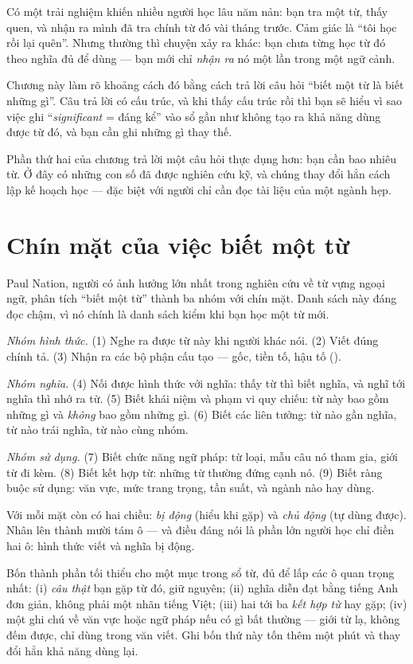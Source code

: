 \documentclass[../../english.tex]{subfiles}
\begin{document}
Có một trải nghiệm khiến nhiều người học lâu năm nản: bạn tra một từ, thấy quen, và nhận ra mình đã tra chính từ đó vài tháng trước. Cảm giác là ``tôi học rồi lại quên''. Nhưng thường thì chuyện xảy ra khác: bạn chưa từng học từ đó theo nghĩa đủ để dùng --- bạn mới chỉ \emph{nhận ra} nó một lần trong một ngữ cảnh.

Chương này làm rõ khoảng cách đó bằng cách trả lời câu hỏi ``biết một từ là biết những gì''. Câu trả lời có cấu trúc, và khi thấy cấu trúc rồi thì bạn sẽ hiểu vì sao việc ghi ``\emph{significant} = đáng kể'' vào sổ gần như không tạo ra khả năng dùng được từ đó, và bạn cần ghi những gì thay thế.

Phần thứ hai của chương trả lời một câu hỏi thực dụng hơn: bạn cần bao nhiêu từ. Ở đây có những con số đã được nghiên cứu kỹ, và chúng thay đổi hẳn cách lập kế hoạch học --- đặc biệt với người chỉ cần đọc tài liệu của một ngành hẹp.

\section{Chín mặt của việc biết một từ}

Paul Nation, người có ảnh hưởng lớn nhất trong nghiên cứu về từ vựng ngoại ngữ, phân tích ``biết một từ'' thành ba nhóm với chín mặt\cite{nation2013}. Danh sách này đáng đọc chậm, vì nó chính là danh sách kiểm khi bạn học một từ mới.

\emph{Nhóm hình thức.} (1) Nghe ra được từ này khi người khác nói. (2) Viết đúng chính tả. (3) Nhận ra các bộ phận cấu tạo --- gốc, tiền tố, hậu tố ().

\emph{Nhóm nghĩa.} (4) Nối được hình thức với nghĩa: thấy từ thì biết nghĩa, và nghĩ tới nghĩa thì nhớ ra từ. (5) Biết khái niệm và phạm vi quy chiếu: từ này bao gồm những gì và \emph{không} bao gồm những gì. (6) Biết các liên tưởng: từ nào gần nghĩa, từ nào trái nghĩa, từ nào cùng nhóm.

\emph{Nhóm sử dụng.} (7) Biết chức năng ngữ pháp: từ loại, mẫu câu nó tham gia, giới từ đi kèm. (8) Biết kết hợp từ: những từ thường đứng cạnh nó. (9) Biết ràng buộc sử dụng: văn vực, mức trang trọng, tần suất, và ngành nào hay dùng.

Với mỗi mặt còn có hai chiều: \emph{bị động} (hiểu khi gặp) và \emph{chủ động} (tự dùng được). Nhân lên thành mười tám ô --- và điều đáng nói là phần lớn người học chỉ điền hai ô: hình thức viết và nghĩa bị động.

\begin{cannho}
Bốn thành phần tối thiểu cho một mục trong sổ từ, đủ để lấp các ô quan trọng nhất: (i) \emph{câu thật} bạn gặp từ đó, giữ nguyên; (ii) nghĩa diễn đạt bằng tiếng Anh đơn giản, không phải một nhãn tiếng Việt; (iii) hai tới ba \emph{kết hợp từ} hay gặp; (iv) một ghi chú về văn vực hoặc ngữ pháp nếu có gì bất thường --- giới từ lạ, không đếm được, chỉ dùng trong văn viết. Ghi bốn thứ này tốn thêm một phút và thay đổi hẳn khả năng dùng lại.
\end{cannho}
\end{document}
